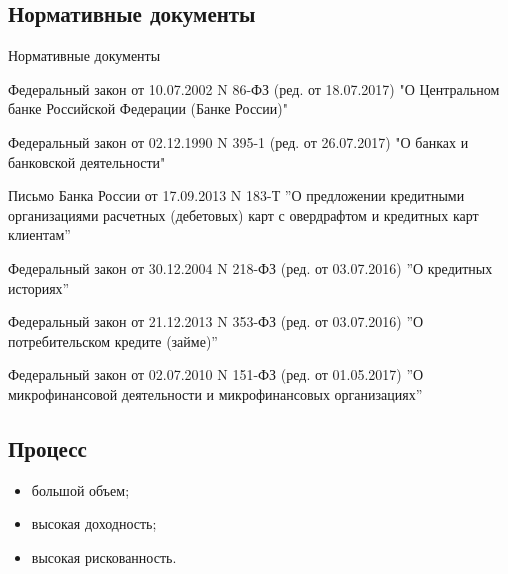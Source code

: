 \documentclass[_Banking_p2.tex]{subfiles}
\begin{document}

\subsection{Нормативные документы}

\begin{frame}[allowframebreaks]{Нормативные документы}
  \begin{thebibliography}{10}
  
  \beamertemplatearticlebibitems

Федеральный закон от 10.07.2002 N 86-ФЗ (ред. от 18.07.2017) "О Центральном банке Российской Федерации (Банке России)"

Федеральный закон от 02.12.1990 N 395-1 (ред. от 26.07.2017) "О банках и банковской деятельности"

Письмо Банка России от 17.09.2013 N 183-Т
”О предложении кредитными организациями
расчетных (дебетовых) карт с овердрафтом и
кредитных карт клиентам”

Федеральный закон от 30.12.2004 N 218-ФЗ
(ред. от 03.07.2016) ”О кредитных историях”

Федеральный закон от 21.12.2013 N 353-ФЗ
(ред. от 03.07.2016) ”О потребительском
кредите (займе)”

Федеральный закон от 02.07.2010 N 151-ФЗ
(ред. от 01.05.2017) ”О микрофинансовой
деятельности и микрофинансовых
организациях”
  \end{thebibliography}
\end{frame}

\subsection{Процесс}
\begin{frame}
\begin{itemize}
	\item большой объем;
	\item высокая доходность;
	\item высокая рискованность.
\end{itemize}	
\end{frame}
\end{document}
